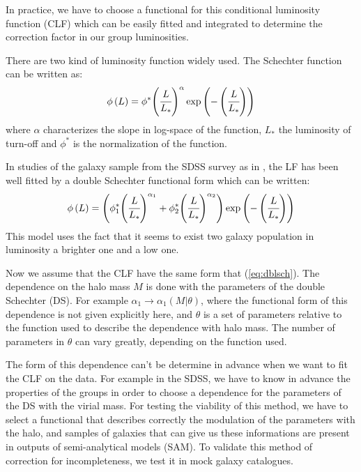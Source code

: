 In practice, we have to choose a functional for this conditional luminosity
function (CLF) which can be easily fitted and integrated to determine the
correction factor in our group luminosities.

There are two kind of luminosity function widely used. The Schechter
function can be written as:
%
\begin{equation}
    \phi\left(L\right)=\phi^*{\left(\cfrac{L}{L_*}\right)}^\alpha
    \exp\left(-\left(\cfrac{L}{L_*}\right)\right)
\end{equation}
%
where $\alpha$ characterizes the slope in log-space of the function, $L_*$
the luminosity of turn-off and $\phi^*$ is the normalization of the
function.

In studies of the galaxy sample from the SDSS survey as in
\citet{Blanton+05}, the LF has been well fitted by a double Schechter
functional form which can be written:
%
\begin{equation}\label{eq:dblsch}
    \phi\left({L}\right)=\left({\phi_1^*{\left({\cfrac{L}{L_*}}\right)}^{\alpha_1}+\phi_2^*{\left({\cfrac{L}{L_*}}\right)}^{\alpha_2}}\right)\exp\left({-\left({\cfrac{L}{L_*}}\right)}\right)%
\end{equation}
%
This model uses the fact that it seems to exist two galaxy population in
luminosity a brighter one and a low one.

Now we assume that the CLF have the same form that (\ref{eq:dblsch}). The
dependence on the halo mass $M$ is done with the parameters of the double
Schechter (DS). For example
$\alpha_1\rightarrow\alpha_1\left({M|\theta}\right)$, where the functional
form of this dependence is not given explicitly here, and $\theta$ is a set
of parameters relative to the function used to describe the dependence with
halo mass. The number of parameters in $\theta$ can vary greatly, depending
on the function used.

The form of this dependence can't be determine in advance when we want to
fit the CLF on the data. For example in the SDSS, we have to know in advance
the properties of the groups in order to choose a dependence for the
parameters of the DS with the virial mass. For testing the viability of this
method, we have to select a functional that describes correctly the
modulation of the parameters with the halo, and samples of galaxies that can
give us these informations are present in outputs of semi-analytical models
(SAM). To validate this method of correction for incompleteness, we test it
in mock galaxy catalogues.
%
